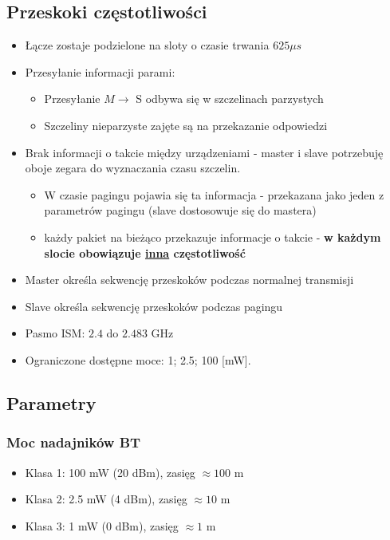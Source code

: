 \subsection{Przeskoki częstotliwości}
\begin{itemize}
	\item Łącze zostaje podzielone na sloty o czasie trwania $ 625 \mu s $
	\item Przesyłanie informacji parami:
	\begin{itemize}
		\item Przesyłanie $ M \rightarrow $ S odbywa się w szczelinach parzystych
		\item Szczeliny nieparzyste zajęte są na przekazanie odpowiedzi
	\end{itemize}
	\item Brak informacji o takcie między urządzeniami - master i slave potrzebuję oboje zegara do wyznaczania czasu szczelin.
	\begin{itemize}
		\item W czasie pagingu pojawia się ta informacja - przekazana jako jeden z parametrów pagingu (slave dostosowuje się do mastera)
		\item każdy pakiet na bieżąco przekazuje informacje o takcie - \textbf{w każdym slocie obowiązuje \underline{inna} częstotliwość}
	\end{itemize}
	\item Master określa sekwencję przeskoków podczas normalnej transmisji
	\item Slave określa sekwencję przeskoków podczas pagingu
	\item Pasmo ISM: $ 2.4 $ do $ 2.483 $ GHz
	\item Ograniczone dostępne moce: 1; 2.5; 100 [mW].
\end{itemize}

\subsection{Parametry}
\subsubsection{Moc nadajników BT}
\begin{itemize}
	\item Klasa 1: 100 mW (20 dBm), zasięg $ \approx 100 $ m
	\item Klasa 2: 2.5 mW (4 dBm), zasięg $ \approx 10 $ m
	\item Klasa 3: 1 mW (0 dBm), zasięg $ \approx 1 $ m
\end{itemize}
